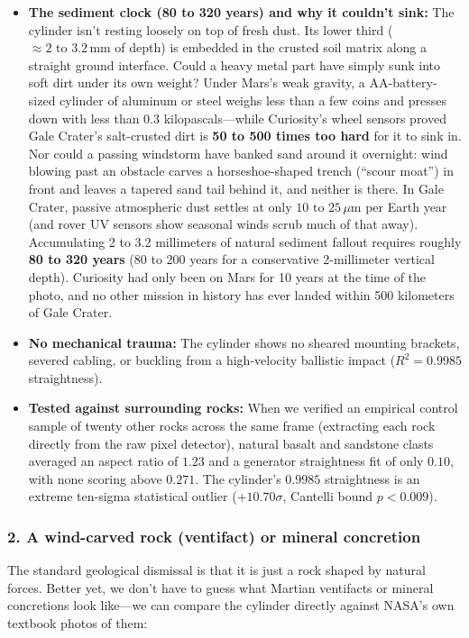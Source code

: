 \documentclass[11pt,a4paper]{article}
\begin{document}
\begin{itemize}
	\item \textbf{The sediment clock (80 to 320 years) and why it couldn't sink:} The cylinder isn't resting loosely on top of fresh dust. Its lower third ($\approx 2\text{ to }3.2\,\text{mm}$ of depth) is embedded in the crusted soil matrix along a straight ground interface. Could a heavy metal part have simply sunk into soft dirt under its own weight? Under Mars's weak gravity, a AA-battery-sized cylinder of aluminum or steel weighs less than a few coins and presses down with less than 0.3 kilopascals---while Curiosity's wheel sensors proved Gale Crater's salt-crusted dirt is \textbf{50 to 500 times too hard} for it to sink in. Nor could a passing windstorm have banked sand around it overnight: wind blowing past an obstacle carves a horseshoe-shaped trench (``scour moat'') in front and leaves a tapered sand tail behind it, and neither is there. In Gale Crater, passive atmospheric dust settles at only $10\text{ to }25\,\mu\text{m}$ per Earth year (and rover UV sensors show seasonal winds scrub much of that away). Accumulating 2 to 3.2 millimeters of natural sediment fallout requires roughly \textbf{80 to 320 years} (80 to 200 years for a conservative 2-millimeter vertical depth). Curiosity had only been on Mars for 10 years at the time of the photo, and no other mission in history has ever landed within 500 kilometers of Gale Crater.
	\item \textbf{No mechanical trauma:} The cylinder shows no sheared mounting brackets, severed cabling, or buckling from a high-velocity ballistic impact ($R^2 = 0.9985$ straightness).
	\item \textbf{Tested against surrounding rocks:} When we verified an empirical control sample of twenty other rocks across the same frame (extracting each rock directly from the raw pixel detector), natural basalt and sandstone clasts averaged an aspect ratio of $1.23$ and a generator straightness fit of only $0.10$, with none scoring above $0.271$. The cylinder's $0.9985$ straightness is an extreme ten-sigma statistical outlier ($+10.70\sigma$, Cantelli bound $p < 0.009$).
\end{itemize}

\subsubsection*{2. A wind-carved rock (ventifact) or mineral concretion}
The standard geological dismissal is that it is just a rock shaped by natural forces. Better yet, we don't have to guess what Martian ventifacts or mineral concretions look like---we can compare the cylinder directly against NASA's own textbook photos of them:
\end{document}
